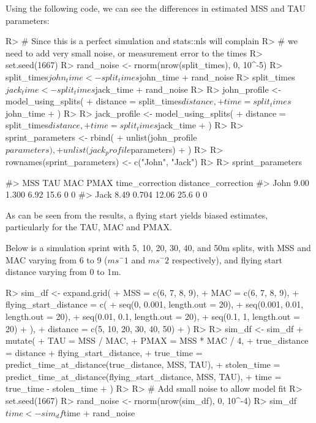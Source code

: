 \documentclass[
]{jss}
\begin{document}
Using the following code, we can see the differences in estimated MSS and TAU parameters:

\begin{CodeChunk}
\begin{CodeInput}
R> # Since this is a perfect simulation and stats::nls will complain
R> # we need to add very small noise, or measurement error to the times
R> set.seed(1667)
R> rand_noise <- rnorm(nrow(split_times), 0, 10^-5)
R> split_times$john_time <- split_times$john_time + rand_noise
R> split_times$jack_time <- split_times$jack_time + rand_noise
R> 
R> john_profile <- model_using_splits(
+   distance = split_times$distance,
+   time = split_times$john_time
+ )
R> 
R> jack_profile <- model_using_splits(
+   distance = split_times$distance,
+   time = split_times$jack_time
+ )
R> 
R> sprint_parameters <- rbind(
+   unlist(john_profile$parameters),
+   unlist(jack_profile$parameters)
+ )
R> 
R> rownames(sprint_parameters) <- c("John", "Jack")
R> 
R> sprint_parameters
\end{CodeInput}
\begin{CodeOutput}
#>       MSS   TAU   MAC PMAX time_correction distance_correction
#> John 9.00 1.300  6.92 15.6               0                   0
#> Jack 8.49 0.704 12.06 25.6               0                   0
\end{CodeOutput}
\end{CodeChunk}

As can be seen from the results, a flying start yields biased estimates, particularly for the TAU, MAC and PMAX.

Below is a simulation sprint with 5, 10, 20, 30, 40, and 50m splits, with MSS and MAC varying from 6 to 9 (\(ms^-1\) and \(ms^-2\) respectively), and flying start distance varying from 0 to 1m.

\begin{CodeChunk}
\begin{CodeInput}
R> sim_df <- expand.grid(
+   MSS = c(6, 7, 8, 9),
+   MAC = c(6, 7, 8, 9),
+   flying_start_distance = c(
+     seq(0, 0.001, length.out = 20),
+     seq(0.001, 0.01, length.out = 20),
+     seq(0.01, 0.1, length.out = 20),
+     seq(0.1, 1, length.out = 20)
+   ),
+   distance = c(5, 10, 20, 30, 40, 50)
+ )
R> 
R> sim_df <- sim_df %
+   mutate(
+     TAU = MSS / MAC,
+     PMAX = MSS * MAC / 4,
+     true_distance = distance + flying_start_distance,
+     true_time = predict_time_at_distance(true_distance, MSS, TAU),
+     stolen_time = predict_time_at_distance(flying_start_distance, MSS, TAU),
+     time = true_time - stolen_time
+   )
R> 
R> # Add small noise to allow model fit
R> set.seed(1667)
R> rand_noise <- rnorm(nrow(sim_df), 0, 10^-4)
R> sim_df$time <- sim_df$time + rand_noise
\end{CodeInput}
\end{CodeChunk}
\end{document}
